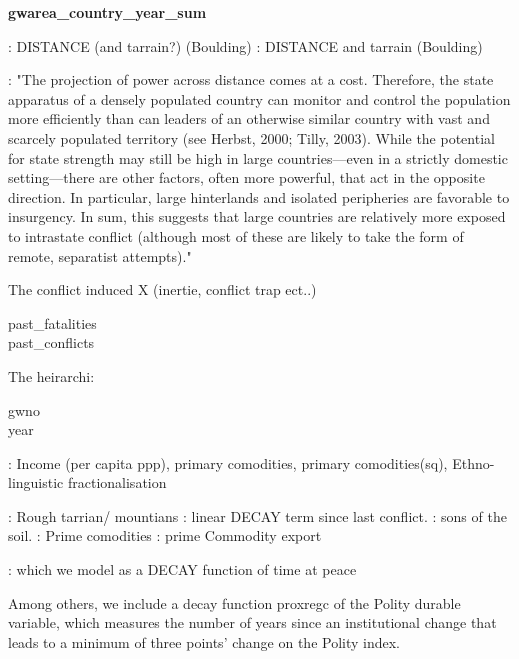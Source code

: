 \textbf{gwarea\_country\_year\_sum}



\cite{Buhaug_Gates_Lujala_2009} : DISTANCE (and tarrain?) (Boulding)
\cite{Cederman_Buhaug_Roed_2009} : DISTANCE and tarrain (Boulding)

\cite{Buhaug_2010}: "The projection of power across distance comes
at a cost. Therefore, the state apparatus of a densely populated country can monitor
and control the population more efficiently than can leaders of an otherwise similar
country with vast and scarcely populated territory (see Herbst, 2000; Tilly, 2003).
While the potential for state strength may still be high in large countries—even in
a strictly domestic setting—there are other factors, often more powerful, that act
in the opposite direction. In particular, large hinterlands and isolated peripheries
are favorable to insurgency. In sum, this suggests that large countries are relatively
more exposed to intrastate conflict (although most of these are likely to take the
form of remote, separatist attempts)."


The conflict induced X (inertie, conflict trap ect..)

\begin{description}
\item [past\_fatalities]  
\item [past\_conflicts]  
\end{description}


The heirarchi:
\begin{description}
\item [gwno]  
\item [year]  

\end{description}





\cite{Collier_Hoeffler_1998} : Income (per capita ppp), primary comodities, primary comodities(sq), Ethno-linguistic fractionalisation

\cite{Fearon_Laitin_2003} : Rough tarrian/ mountians
\cite{Collier_Hoeffler_2004} : linear DECAY term since last conflict.
\cite{Fearon_2004} : sons of the soil.
\cite{Ross_2004} : Prime comodities
\cite{Fearon_2005} : prime Commodity export


\cite{Hegre_Sambanis_2006} : which we model as a DECAY function of time at peace

Among others, we include a decay function proxregc of the Polity
durable variable, which measures the number of years since an institutional change
that leads to a minimum of three points' change on the Polity index.

